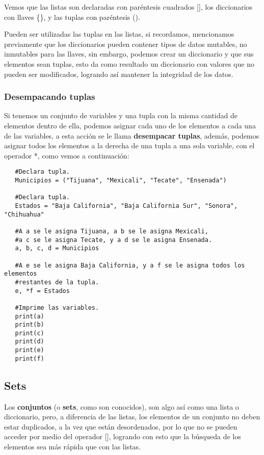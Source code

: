 Vemos que las listas son declaradas con paréntesis cuadrados [], los diccionarios con llaves \{\}, y las tuplas con paréntesis ().

Pueden ser utilizadas las tuplas en las listas, si recordamos, mencionamos previamente que los diccionarios pueden contener tipos de datos mutables, no inmutables para las llaves, sin embargo, podemos crear un diccionario y que sus elementos sean tuplas, esto da como resultado un diccionario con valores que no pueden ser modificados, logrando así mantener la integridad de los datos.


\subsubsection{Desempacando tuplas}
\hspace{0.55cm}Si tenemos un conjunto de variables y una tupla con la misma cantidad de elementos dentro de ella, podemos asignar cada uno de los elementos a cada una de las variables, a esta acción se le llama \textbf{desempacar tuplas}, además, podemos asignar todos los elementos a la derecha de una tupla a una sola variable, con el operador *, como vemos a continuación:
\begin{lstlisting}
   #Declara tupla.
   Municipios = ("Tijuana", "Mexicali", "Tecate", "Ensenada")
   
   #Declara tupla.
   Estados = "Baja California", "Baja California Sur", "Sonora", "Chihuahua"
   
   #A a se le asigna Tijuana, a b se le asigna Mexicali,
   #a c se le asigna Tecate, y a d se le asigna Ensenada.
   a, b, c, d = Municipios
   
   #A e se le asigna Baja California, y a f se le asigna todos los elementos
   #restantes de la tupla.   
   e, *f = Estados   
   
   #Imprime las variables.
   print(a)
   print(b)
   print(c)
   print(d)
   print(e)
   print(f)
\end{lstlisting}


\subsection{Sets}
\hspace{0.55cm}Los \textbf{conjuntos} (o \textbf{sets}, como son conocidos), son algo así como una lista o diccionario, pero, a diferencia de las listas, los elementos de un conjunto no deben estar duplicados, a la vez que están desordenados, por lo que no se pueden acceder por medio del operador [], logrando con esto que la búsqueda de los elementos sea más rápida que con las listas.

